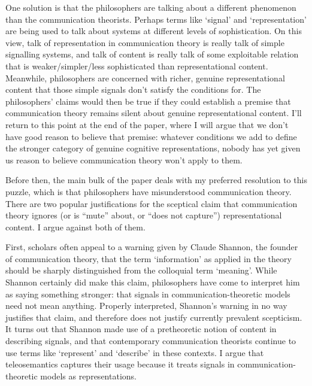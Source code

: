 \documentclass[12pt]{article}
\begin{document}
One solution is that the philosophers are talking about a different phenomenon than the communication theorists.
Perhaps terms like `signal' and `representation' are being used to talk about systems at different levels of sophistication.
On this view, talk of representation in communication theory is really talk of simple signalling systems, and talk of content is really talk of some exploitable relation that is weaker/simpler/less sophisticated than representational content.
Meanwhile, philosophers are concerned with richer, genuine representational content that those simple signals don't satisfy the conditions for.
The philosophers' claims would then be true if they could establish a premise that communication theory remains silent about genuine representational content.
I'll return to this point at the end of the paper, where I will argue that we don't have good reason to believe that premise: whatever conditions we add to define the stronger category of genuine cognitive representations, nobody has yet given us reason to believe communication theory won't apply to them.

Before then, the main bulk of the paper deals with my preferred resolution to this puzzle, which is that philosophers have misunderstood communication theory.
There are two popular justifications for the sceptical claim that communication theory ignores (or is ``mute'' about, or ``does not capture'') representational content.
I argue against both of them.

First, scholars often appeal to a warning given by Claude Shannon, the founder of communication theory, that the term `information' as applied in the theory should be sharply distinguished from the colloquial term `meaning'.
While Shannon certainly did make this claim, philosophers have come to interpret him as saying something stronger: that signals in communication-theoretic models need not mean anything.
Properly interpreted, Shannon's warning in no way justifies that claim, and therefore does not justify currently prevalent scepticism.
It turns out that Shannon made use of a pretheoretic notion of content in describing signals, and that contemporary communication theorists continue to use terms like `represent' and `describe' in these contexts.
I argue that teleosemantics captures their usage because it treats signals in communication-theoretic models as representations.
\end{document}
